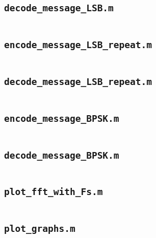 \documentclass{article}
\begin{document}
\newpage
\subsection{\texttt{decode\_message\_LSB.m}}
\inputminted[xleftmargin=24pt, linenos=true, breaklines]{matlab}{src/decode_message_LSB.m}

\newpage
\subsection{\texttt{encode\_message\_LSB\_repeat.m}}
\inputminted[xleftmargin=24pt, linenos=true, breaklines]{matlab}{src/encode_message_LSB_repeat.m}

\newpage
\subsection{\texttt{decode\_message\_LSB\_repeat.m}}
\inputminted[xleftmargin=24pt, linenos=true, breaklines]{matlab}{src/decode_message_LSB_repeat.m}

\newpage
\subsection{\texttt{encode\_message\_BPSK.m}}
\inputminted[xleftmargin=24pt, linenos=true, breaklines]{matlab}{src/encode_message_BPSK.m}

\newpage
\subsection{\texttt{decode\_message\_BPSK.m}}
\inputminted[xleftmargin=24pt, linenos=true, breaklines]{matlab}{src/decode_message_BPSK.m}

\newpage
\subsection{\texttt{plot\_fft\_with\_Fs.m}}
\inputminted[xleftmargin=24pt, linenos=true, breaklines]{matlab}{src/plot_fft_with_Fs.m}

\newpage
\subsection{\texttt{plot\_graphs.m}}
\inputminted[xleftmargin=24pt, linenos=true, breaklines]{matlab}{plot_graphs.m}
\end{document}
